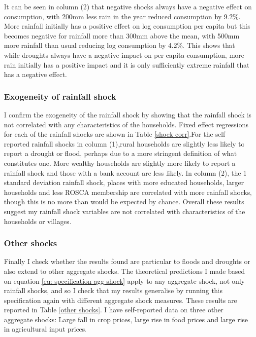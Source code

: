 It can be seen in column (2) that negative shocks always have a negative effect on consumption, with 200mm less rain in the year reduced consumption by 9.2\%. More rainfall initially has a positive effect on log consumption per capita but this becomes negative for rainfall more than 300mm above the mean, with 500mm more rainfall than usual reducing log consumption by 4.2\%. This shows that while droughts always have a negative impact on per capita consumption, more rain initially has a positive impact and it is only sufficiently extreme rainfall that has a negative effect. 


\subsubsection{Exogeneity of rainfall shock}
I confirm the exogeneity of the rainfall shock by showing that the rainfall shock is not correlated with any characteristics of the households. Fixed effect regressions for each of the rainfall shocks are shown in Table \ref{shock corr}.For the self reported rainfall shocks in column (1),rural households are slightly less likely to report a drought or flood, perhaps due to a more stringent definition of what constitutes one. More wealthy households are slightly more likely to report a rainfall shock and those with a bank account are less likely.  In column (2), the 1 standard deviation rainfall shock, places with more educated households, larger households and less ROSCA membership are correlated with more rainfall shocks, though this is no more than would be expected by chance. Overall these results suggest my rainfall shock variables are not correlated with characteristics of the households or villages. 


 
\subsubsection{Other shocks}
Finally I check whether the results found are particular to floods and droughts or also extend to other aggregate shocks. The theoretical predictions I made based on equation \eqref{eq: specification agg shock} apply to any aggregate shock, not only rainfall shocks, and so I check that my results generalise by running this specification again with different aggregate shock measures. These results are reported in Table \ref{other shocks}. I have self-reported data on three other aggregate shocks: Large fall in crop prices, large rise in food prices and large rise in agricultural input prices. 


